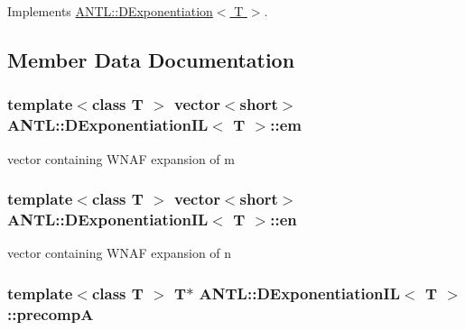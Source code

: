 Implements \hyperlink{classANTL_1_1DExponentiation_a3c8c562a37b0d5d849ab1cfb3adfc73f}{A\-N\-T\-L\-::\-D\-Exponentiation$<$ T $>$}.



\subsection{Member Data Documentation}
\hypertarget{classANTL_1_1DExponentiationIL_a74c7cd8f99ea1d74985b8792b4cd7df7}{
\subsubsection[{em}]{\setlength{\rightskip}{0pt plus 5cm}template$<$class T $>$ vector$<$short$>$ {\bf A\-N\-T\-L\-::\-D\-Exponentiation\-I\-L}$<$ T $>$\-::em\hspace{0.3cm}{\ttfamily [protected]}}}\label{classANTL_1_1DExponentiationIL_a74c7cd8f99ea1d74985b8792b4cd7df7}
vector containing W\-N\-A\-F expansion of m \hypertarget{classANTL_1_1DExponentiationIL_abb28e5efa2941fa9a0b35644b7d45697}{
\subsubsection[{en}]{\setlength{\rightskip}{0pt plus 5cm}template$<$class T $>$ vector$<$short$>$ {\bf A\-N\-T\-L\-::\-D\-Exponentiation\-I\-L}$<$ T $>$\-::en\hspace{0.3cm}{\ttfamily [protected]}}}\label{classANTL_1_1DExponentiationIL_abb28e5efa2941fa9a0b35644b7d45697}
vector containing W\-N\-A\-F expansion of n \hypertarget{classANTL_1_1DExponentiationIL_a384794528ac65b531a5d6efccae95660}{
\subsubsection[{precomp\-A}]{\setlength{\rightskip}{0pt plus 5cm}template$<$class T $>$ T$\ast$ {\bf A\-N\-T\-L\-::\-D\-Exponentiation\-I\-L}$<$ T $>$\-::precomp\-A\hspace{0.3cm}{\ttfamily [protected]}}}\label{classANTL_1_1DExponentiationIL_a384794528ac65b531a5d6efccae95660}
